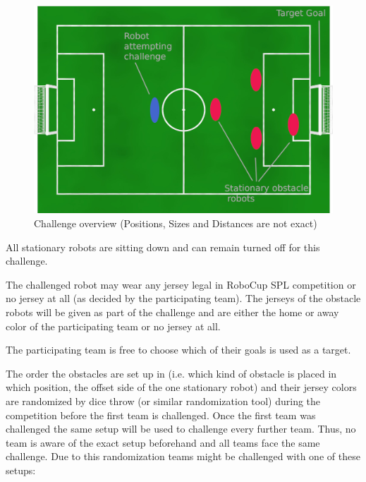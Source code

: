 \begin{figure}[ht]
    \centering
    \includegraphics[width=1.0\textwidth]{figs/obstacle_challenge_2021.jpeg}
	\caption{Challenge overview (Positions, Sizes and Distances are not exact)}
\end{figure}

All stationary robots are sitting down and can remain turned off for this challenge.

The challenged robot may wear any jersey legal in RoboCup SPL competition or no jersey at all (as decided by the participating team). The jerseys of the obstacle robots will be given as part of the challenge and are either the home or away color of the participating team or no jersey at all.

The participating team is free to choose which of their goals is used as a target.

The order the obstacles are set up in (i.e. which kind of obstacle is placed in which position, the offset side of the one stationary robot) and their jersey colors are randomized by dice throw (or similar randomization tool) during the competition before the first team is challenged. Once the first team was challenged the same setup will be used to challenge every further team. Thus, no team is aware of the exact setup beforehand and all teams face the same challenge. Due to this randomization teams might be challenged with one of these setups:

